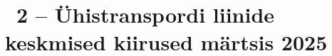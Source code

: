 
\clearpage %
\label{chapter:appendix-something} %
\chapter*{\appendixTitle~2 -- Ühistranspordi liinide keskmised kiirused märtsis 2025} %
%
